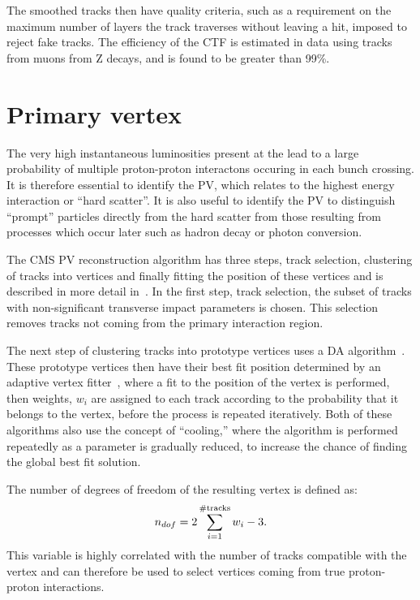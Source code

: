 The smoothed tracks then have quality criteria, such as a requirement on the maximum number of layers the track traverses without leaving a hit, imposed to reject fake tracks. The efficiency of the \ac{CTF} is estimated in data using tracks from muons from Z decays, and is found to be greater than 99\%.

\section{Primary vertex}
\label{sec:PV}
The very high instantaneous luminosities present at the \LHC lead to a large probability of multiple proton-proton interactons occuring in each bunch crossing. It is therefore essential to identify the \ac{PV}, which relates to the highest energy interaction or ``hard scatter''. It is also useful to identify the \ac{PV} to distinguish ``prompt'' particles directly from the hard scatter from those resulting from processes which occur later such as hadron decay or photon conversion.

The CMS \ac{PV} reconstruction algorithm has three steps, track selection, clustering of tracks into vertices and finally fitting the position of these vertices and is described in more detail in~\cite{1748-0221-9-10-P10009}. In the first step, track selection, the subset of tracks with non-significant transverse impact parameters is chosen. This selection removes tracks not coming from the primary interaction region.

The next step of clustering tracks into prototype vertices uses a \ac{DA} algorithm~\cite{DetAnnealing}. These prototype vertices then have their best fit position determined by an adaptive vertex fitter~\cite{adaptivevertex}, where a fit to the position of the vertex is performed, then weights, $w_{i}$ are assigned to each track according to the probability that it belongs to the vertex, before the process is repeated iteratively. Both of these algorithms also use the concept of ``cooling,'' where the algorithm is performed repeatedly as a parameter is gradually reduced, to increase the chance of finding the global best fit solution.

The number of degrees of freedom of the resulting vertex is defined as:
\begin{equation}
  \label{eq:vertdof}
  n_{dof}=2\displaystyle\sum_{i=1}^{\# \rm{tracks}}w_i -3.
\end{equation}
This variable is highly correlated with the number of tracks compatible with the vertex and can therefore be used to select vertices coming from true proton-proton interactions.

